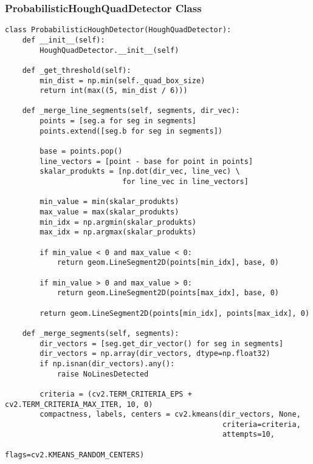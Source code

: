 \subsubsection{ProbabilisticHoughQuadDetector Class}

\begin{verbatim}
class ProbabilisticHoughDetector(HoughQuadDetector):
    def __init__(self):
        HoughQuadDetector.__init__(self)
    
    def _get_threshold(self):
        min_dist = np.min(self._quad_box_size)
        return int(max((5, min_dist / 6)))
    
    def _merge_line_segments(self, segments, dir_vec):
        points = [seg.a for seg in segments]
        points.extend([seg.b for seg in segments])
        
        base = points.pop()
        line_vectors = [point - base for point in points]
        skalar_produkts = [np.dot(dir_vec, line_vec) \
                           for line_vec in line_vectors]
        
        min_value = min(skalar_produkts)
        max_value = max(skalar_produkts)
        min_idx = np.argmin(skalar_produkts)
        max_idx = np.argmax(skalar_produkts)
        
        if min_value < 0 and max_value < 0:
            return geom.LineSegment2D(points[min_idx], base, 0)
        
        if min_value > 0 and max_value > 0:
            return geom.LineSegment2D(points[max_idx], base, 0)
        
        return geom.LineSegment2D(points[min_idx], points[max_idx], 0)
    
    def _merge_segments(self, segments):
        dir_vectors = [seg.get_dir_vector() for seg in segments]
        dir_vectors = np.array(dir_vectors, dtype=np.float32)
        if np.isnan(dir_vectors).any():
            raise NoLinesDetected
        
        criteria = (cv2.TERM_CRITERIA_EPS + cv2.TERM_CRITERIA_MAX_ITER, 10, 0)
        compactness, labels, centers = cv2.kmeans(dir_vectors, None, 
                                                  criteria=criteria, 
                                                  attempts=10, 
                                                  flags=cv2.KMEANS_RANDOM_CENTERS)
        

\end{verbatim}
